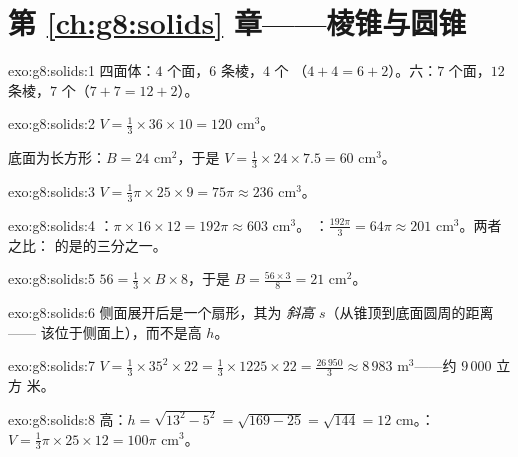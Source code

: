 \section*{第 \ref{ch:g8:solids} 章——棱锥与圆锥}

\begin{solution}{exo:g8:solids:1}
四面体：$4$ 个面，$6$ 条棱，$4$ 个
（$4 + 4 = 6 + 2$）。六：$7$ 个面，$12$ 条棱，$7$
个（$7 + 7 = 12 + 2$）。
\end{solution}

\begin{solution}{exo:g8:solids:2}
$V = \frac13 \times 36 \times 10 = 120$ cm$^3$。

底面为长方形：$B = 24$ cm$^2$，于是
$V = \frac13 \times 24 \times 7.5 = 60$ cm$^3$。
\end{solution}

\begin{solution}{exo:g8:solids:3}
$V = \frac13 \pi \times 25 \times 9 = 75\pi \approx 236$ cm$^3$。
\end{solution}

\begin{solution}{exo:g8:solids:4}
：$\pi \times 16 \times 12 = 192\pi \approx 603$ cm$^3$。
：$\frac{192\pi}{3} = 64\pi \approx 201$ cm$^3$。两者之比：
的是的三分之一。
\end{solution}

\begin{solution}{exo:g8:solids:5}
$56 = \frac13 \times B \times 8$，于是 $B = \frac{56 \times 3}{8} = 21$
cm$^2$。
\end{solution}

\begin{solution}{exo:g8:solids:6}
侧面展开后是一个扇形，其为
\emph{斜高} $s$（从锥顶到底面圆周的距离——
该位于侧面上），而不是高 $h$。
\end{solution}

\begin{solution}{exo:g8:solids:7}
$V = \frac13 \times 35^2 \times 22 = \frac13 \times 1225 \times 22
= \frac{26\,950}{3} \approx 8\,983$ m$^3$——约 $9\,000$ 立方
米。
\end{solution}

\begin{solution}{exo:g8:solids:8}
高：$h = \sqrt{13^2 - 5^2} = \sqrt{169 - 25} = \sqrt{144} = 12$
cm。：$V = \frac13 \pi \times 25 \times 12 = 100\pi$ cm$^3$。
\end{solution}

